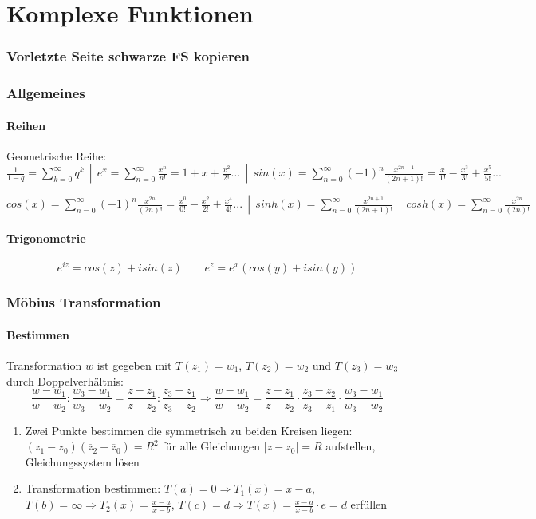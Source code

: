 \documentclass[10pt,a4paper]{article}
\begin{document}
\part*{Komplexe Funktionen}

\section{Vorletzte Seite schwarze FS kopieren}

\section{Allgemeines}
\subsection{Reihen}
Geometrische Reihe: $\frac{1}{1-q} = \sum\limits_{k=0}^\infty q^k\ \  |\ \  e^x = \sum\limits_{n=0}^\infty \frac{x^n}{n!} = 1+x+\frac{x^2}{2!} ... \ \ |\ \ sin(x)=\sum\limits_{n=0}^\infty (-1)^n \frac{x^{2n+1}}{(2n+1)!} = \frac{x}{1!} - \frac{x^3}{3!} + \frac{x^5}{5!}...$

$cos(x)=\sum\limits_{n=0}^\infty (-1)^n \frac{x^{2n}}{(2n)!} = \frac{x^0}{0!} - \frac{x^2}{2!} + \frac{x^4}{4!}...
 \ \ |\ \ sinh(x)=\sum\limits_{n=0}^\infty \frac{x^{2n+1}}{(2n+1)!}
  \ \ |\ \ cosh(x)=\sum\limits_{n=0}^\infty \frac{x^{2n}}{(2n)!}$

\subsection{Trigonometrie}
\[e^{iz} = cos(z)+i sin(z)\ \ \ \ \ \ \ \ \ e^z = e^x(cos(y)+i sin(y))\]

\section{Möbius Transformation}
\subsection{Bestimmen}
Transformation $w$ ist gegeben mit $T(z_1)=w_1$, $T(z_2)=w_2$ und $T(z_3)=w_3$ durch Doppelverhältnis:
\[
\frac{w-w_1}{w-w_2} : \frac{w_3-w_1}{w_3-w_2} = \frac{z-z_1}{z-z_2} : \frac{z_3-z_1}{z_3-z_2}
\Rightarrow
\frac{w-w_1}{w-w_2} = \frac{z-z_1}{z-z_2} \cdot \frac{z_3-z_2}{z_3-z_1}  \cdot \frac{w_3-w_1}{w_3-w_2}
\]
\begin{enumerate}
\item Zwei Punkte bestimmen die symmetrisch zu beiden Kreisen liegen: $(z_1 - z_0)(\overline{z}_2 - \overline{z}_0) = R^2$ für alle Gleichungen $|z - z_0| = R$ aufstellen, Gleichungssystem lösen
\item Transformation bestimmen: $T(a) = 0 \Rightarrow T_1(x) = x - a$, $T(b) = \infty \Rightarrow T_2(x) = \frac{x-a}{x-b}$, $T(c) = d \Rightarrow T(x) = \frac{x-a}{x-b} \cdot e = d$ erfüllen
\end{enumerate}
\end{document}
